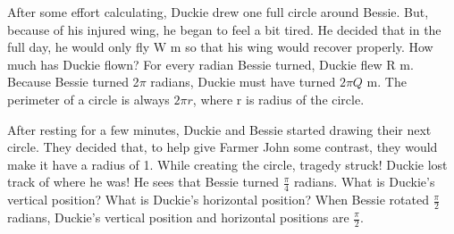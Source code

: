  {After some effort calculating, Duckie drew one full circle around Bessie. But, because of his injured wing, he began to feel a bit tired. He decided that in the full day, he would only fly W m so that his wing would recover properly. How much has Duckie flown?}
 {For every radian Bessie turned, Duckie flew R m. Because Bessie turned 2$\pi$ radians, Duckie must have turned $2\pi Q$ m.}
 {The perimeter of a circle is always $2\pi r$, where r is radius of the circle.}
 {}
 {After resting for a few minutes, Duckie and Bessie started drawing their next circle. They decided that, to help give Farmer John some contrast, they would make it have a radius of 1. While creating the circle, tragedy struck! Duckie lost track of where he was! He sees that Bessie turned $\frac{\pi}{4}$ radians. What is Duckie's vertical position? What is Duckie's horizontal position?}
 {When Bessie rotated $\frac{\pi}{2}$ radians, Duckie's vertical position and horizontal positions are $\frac{\pi}{2}$.}
